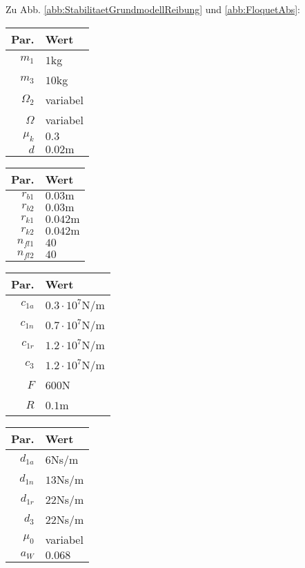 Zu Abb. \ref{abb:StabilitaetGrundmodellReibung} und \ref{abb:FloquetAbs}:
\begin{center}
\begin{tabular}{r|l}
Par.&Wert\\\hline
$m_1$&$1$kg\\
$m_3$&$10$kg\\
$\Omega_2$&variabel\\
$\Omega$& variabel\\
$\mu_k$& $0.3$\\
$d $&$ 0.02\textrm{m}$ \\
\end{tabular}\hfill
\begin{tabular}{r|l}
Par.&Wert\\\hline
$r_{b1}$&$0.03\textrm{m}$\\
$r_{b2}$&$0.03\textrm{m}$\\
$r_{k1}$&$0.042\textrm{m}$\\
$r_{k2}$&$0.042\textrm{m}$\\
$n_{fl1}$&$40$\\
$n_{fl2}$&$40$\\
\end{tabular}\hfill
\begin{tabular}{r|l}
Par.&Wert\\\hline
$c_{1a}$&$0.3\cdot10^{7}$N/m\\
$c_{1n}$&$0.7\cdot10^{7}$N/m\\
$c_{1r}$&$1.2\cdot10^{7}$N/m\\
$c_{3}$&$1.2\cdot10^{7}$N/m\\
$F$&$600$N\\
$R$&$0.1$m\\
\end{tabular}\hfill
\begin{tabular}{r|l}
Par.&Wert\\\hline
$d_{1a}$&$6$Ns/m\\
$d_{1n}$&$13$Ns/m\\
$d_{1r}$&$22$Ns/m\\
$d_{3}$&$22$Ns/m\\
$\mu_0$&variabel\\
$a_W $&$ 0.068$\\
\end{tabular}
\end{center}

